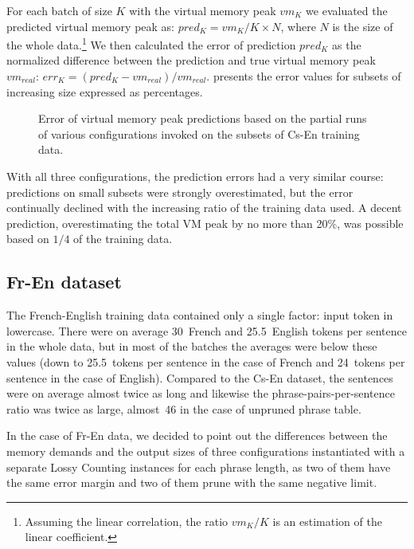 For each batch of size $K$ with the virtual memory peak $vm_{K}$ we evaluated the predicted virtual
memory peak as: $pred_{K} = vm_{K} / K \times N$, where $N$ is the size of the whole
data.\footnote{Assuming the linear correlation, the ratio $vm_{K} / K$ is an estimation of the linear coefficient.}
We then calculated the error of prediction $pred_{K}$ as the normalized difference between
the prediction and true virtual memory peak $vm_{real}$: $err_{K} = (pred_{K} - vm_{real}) / vm_{real}$.
 presents the error values for subsets of increasing size
expressed as percentages.

\begin{figure}[!htb]
  \centering
  
  \caption{
    Error of virtual memory peak predictions based on the partial runs of various \eppex{} configurations
    invoked on the subsets of Cs-En training data.
  }
  \label{fig:cs-en-vm-peak-prediction}
\end{figure}

With all three configurations, the prediction errors had a very similar course: predictions on small
subsets were strongly overestimated, but the error continually declined with the increasing ratio
of the training data used.
A decent prediction, overestimating the total VM peak by no more than 20\%, was possible based on $1/4$
of the training data.

\subsection{Fr-En dataset}

The French-English training data contained only a single factor: input token in lowercase.
There were on average 30~French and 25.5~English tokens per sentence in the whole data,
but in most of the batches the averages were below these values (down to 25.5~tokens
per sentence in the case of French and 24~tokens per sentence in the case of English).
Compared to the Cs-En dataset, the sentences were on average almost twice as long and
likewise the phrase-pairs-per-sentence ratio was twice as large, almost~46 in the case of
unpruned phrase table.

In the case of Fr-En data, we decided to point out the differences between the memory demands
and the output sizes of three \eppex{} configurations instantiated with a separate Lossy Counting
instances for each phrase length, as two of them have the same error margin and two of them
prune with the same negative limit.

